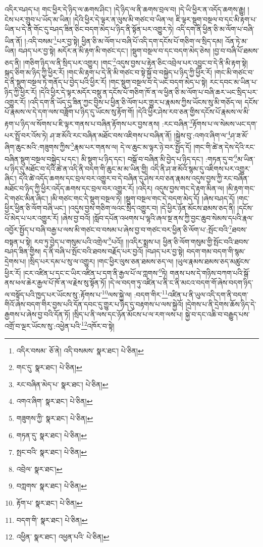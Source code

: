 འདིར་བཤད་པ། གང་ཕྱིར་དེ་ཉིད་ལ་ཆགས་ཤིང་། །དེ་ཉིད་ལ་ནི་ཆགས་བྲལ་བ། །དེ་ཡི་ཕྱིར་ན་འདོད་ཆགས་རྒྱུ། །ངེས་པར་གྲུབ་པ་ཡོད་མ་ཡིན། །དེའི་ཕྱིར་དེ་ལྟར་ན་ལུས་མི་གཙང་བ་ཡིན་ལ། ཇི་ལྟར་སྡུག་བསྔལ་བ་དང་མི་རྟག་པ་ཡིན་པ་དེ་ནི་གོང་དུ་བཤད་ཟིན་ཅིང་བདག་མེད་པ་ཉིད་ནི་སྟོན་པར་འགྱུར་ཏེ། འདི་དག་ནི་ཕྱིན་ཅི་མ་ལོག་པ་བཞི་ཡིན་ནོ། །:འདི་བསམ་\footnote{འདིར་བསམ་  ཅོ་ནེ། འདི་བསམས་  སྣར་ཐང་།  པེ་ཅིན། }པར་བྱ་སྟེ། ཕྱིན་ཅི་མ་ལོག་པ་བཞི་པོ་འདི་དག་དངོས་པོ་གཅིག་ལ་སྲིད་དམ། འོན་ཏེ་མ་ཡིན། བཤད་པར་བྱ་སྟེ། མདོར་ན་མི་རྟག་མི་གཙང་དང་། །སྡུག་བསྔལ་བ་དང་བདག་མེད་ཅེས། །བྱ་བ་བཞི་པོ་ཐམས་ཅད་ནི། །གཅིག་ཉིད་ལ་ནི་སྲིད་པར་འགྱུར། །གང་\footnote{གང་དུ་  སྣར་ཐང་།  པེ་ཅིན། }འདུས་བྱས་པ་རྟེན་ཅིང་འབྲེལ་པར་འབྱུང་བ་དེ་ནི་མི་རྟག་སྟེ། སྐད་ཅིག་མ་ཉིད་ཀྱི་ཕྱིར་རོ། །གང་མི་རྟག་པ་དེ་ནི་མི་གཙང་བ་སྟེ་སྐྱོ་བ་བསྐྱེད་པ་ཉིད་ཀྱི་ཕྱིར་རོ། །གང་མི་གཙང་བ་དེ་ནི་སྡུག་བསྔལ་ཏེ་གནོད་པ་བྱེད་པའི་ཕྱིར་རོ། །གང་སྡུག་བསྔལ་བ་དེ་ཡང་བདག་མེད་པ་སྟེ། རང་དབང་མ་ཡིན་པ་ཉིད་ཀྱི་ཕྱིར་རོ། །དེའི་ཕྱིར་དེ་ལྟར་མདོར་བསྡུ་ན་དངོས་པོ་གཅིག་ཁོ་ན་ལ་ཕྱིན་ཅི་མ་ལོག་པ་བཞི་ཆར་ཡང་སྲིད་པར་འགྱུར་རོ། །འདི་དག་ནི་ཡོད་དུ་ཟིན་ཀྱང་བྱིས་པ་ཕྱིན་ཅི་ལོག་པར་གྱུར་པ་རྣམས་ཀྱིས་ཡོངས་སུ་མི་གཅོད་ལ། དངོས་པོ་རྣམས་ལ་དེ་དག་ལས་བཟློག་པ་ཉིད་དུ་ཡོངས་སུ་རྟོག་གོ། །དེའི་ཕྱིར་ཤེས་རབ་ཅན་གྱིས་དངོས་པོ་རྣམས་ལ་མི་རྟག་པ་ཉིད་ལ་སོགས་པ་ཇི་ལྟར་གནས་པ་བཞིན་རྟོགས་པར་བྱས་ནས། :རང་བཞིན་\footnote{རང་བཞིན་མེད་པ་  སྣར་ཐང་།  པེ་ཅིན། }རྟོགས་པ་ལ་སེམས་ཡང་དག་པར་སྤྲོ་བར་འོས་ཏེ། ཤ་ཟ་མོའི་རང་བཞིན་མཐོང་བས་འཇིགས་པ་བཞིན་ནོ། །སྐྱེས་བུ་:འགའ་ཞིག་ལ་\footnote{འགའ་ཞིག་  སྣར་ཐང་།  པེ་ཅིན། }ཤ་ཟ་མོ་ཞིག་ཆུང་མའི་:གཟུགས་ཀྱིས་\footnote{གཟུགས་ཀྱི་  སྣར་ཐང་།  པེ་ཅིན། }རྣམ་པར་གནས་ལ། དེ་ལ་ཆུང་མ་ལྟར་ཉེ་བར་སྤྱོད་དོ། །གང་གི་ཚེ་ན་དེས་དེའི་རང་བཞིན་སྡུག་བསྔལ་བསྐྱེད་པ་དང་། མི་སྡུག་པ་ཉིད་དང་། བསྒོ་བ་བཞིན་མི་བྱེད་པ་ཉིད་དང་། :གཏན་དུ་བ་\footnote{གཏན་དུ་  སྣར་ཐང་།  པེ་ཅིན། }མ་ཡིན་པ་ཉིད་དུ་མཐོང་བ་དེའི་ཚེ་ན་འདི་ནི་བདག་གི་ཆུང་མ་མ་ཡིན་གྱི། འདི་ནི་ཤ་ཟ་མོའོ་སྙམ་དུ་འཇིགས་པར་འགྱུར་ཞིང་། དེའི་ཚེ་འདོད་ཆགས་དང་བྲལ་བར་འགྱུར་བ་དེ་བཞིན་དུ་ཤེས་རབ་ཅན་རྣམས་འདུས་བྱས་ཀྱི་རང་བཞིན་མཐོང་བ་ཉིད་ཀྱི་ཕྱིར་འདོད་ཆགས་དང་བྲལ་བར་འགྱུར་རོ། །འདིར། འདུས་བྱས་གང་དེ་རྟག་མིན་ལ། །མི་རྟག་གང་དེ་གཙང་མིན་ཞིང་། །མི་གཙང་གང་དེ་སྡུག་བསྔལ་ཏེ། །སྡུག་བསྔལ་གང་དེ་བདག་མེད་དོ། །ཞེས་བཤད་དོ། །གང་ཕྱིར་ཕྱིན་ཅི་ལོག་བཞི་ཡང་། །འདུས་བྱས་གཅིག་ལའང་སྲིད་འགྱུར་བ། །དེ་ཕྱིར་ཉོན་མོངས་ཐམས་ཅད་ནི། །དངོས་པོ་མེད་པ་པར་འགྱུར་རོ། །ཞེས་བྱ་བའོ། །སློབ་དཔོན་འཕགས་པ་ལྷའི་ཞལ་སྔ་ནས་ཀྱི་བྱང་ཆུབ་སེམས་དཔའི་རྣལ་འབྱོར་སྤྱོད་པ་བཞི་བརྒྱ་པ་ལས་མི་གཙང་བ་བསམ་པ་ཞེས་བྱ་བ་གཙང་བར་ཕྱིན་ཅི་ལོག་པ་:སྤོང་བའི་\footnote{སྤང་བའི་  སྣར་ཐང་།  པེ་ཅིན། }ཐབས་བསྟན་པ་སྟེ། རབ་ཏུ་བྱེད་པ་གསུམ་པའི་འགྲེལ་\footnote{འབྲེལ་  སྣར་ཐང་། }པའོ།། །།འདིར་སྨྲས་པ། ཕྱིན་ཅི་ལོག་གསུམ་གྱི་སྤོང་བའི་ཐབས་བཤད་ཟིན་གྱིས། ད་ནི་བཞི་པ་སྤོང་བའི་ཐབས་བརྗོད་པར་བྱའོ། །བཤད་པར་བྱ་སྟེ། བདག་གམ་བདག་གི་སྙམ་དྲེགས་པ། །སྲིད་པར་དམ་པ་སུ་ལ་འགྱུར། །གང་ཕྱིར་ལུས་ཅན་ཐམས་ཅད་ལ། །ཡུལ་རྣམས་ཐམས་ཅད་མཚུངས་ཕྱིར་རོ། །ངར་འཛིན་པ་དང་ང་ཡིར་འཛིན་པ་དག་ནི་རྒྱལ་པོ་ལ་ཀླགས་\footnote{བཀླགས་  སྣར་ཐང་།  པེ་ཅིན། }ཏེ། གནས་པས་དེ་གཉིས་བཀག་པའི་སྒོ་ནས་ཕལ་ཆེར་རྒྱལ་པོ་ཁོ་ན་ལ་རྗེས་སུ་སྟོན་ཏོ། །དེ་ལ་བདག་ཏུ་འཛིན་པ་ནི་ང་ནི་མངའ་བདག་གོ་ཞེས་བདག་ཉིད་ལ་བསྟོད་པའི་ཁྱད་པར་ཡོངས་སུ་:རྟོགས་པ་\footnote{རྟོག་པ་  སྣར་ཐང་།  པེ་ཅིན། }ལས་སྐྱེ་ལ། :བདག་གིར་\footnote{བདག་གི་  སྣར་ཐང་།  པེ་ཅིན། }འཛིན་པ་ནི་ཡུལ་འདི་དག་ནི་བདག་གིའོ་ཞེས་བདག་གིར་བྱས་པའི་དོན་དབང་དུ་གྱུར་པ་ཉིད་དུ་བརྟགས་པ་ལས་སྐྱེའོ། །དྲེགས་པ་ནི་དྲེགས་ཆོས་ཉིད་དེ་རྒྱགས་པ་ཞེས་བྱ་བའི་དོན་ཏོ། །སྲིད་པ་ནི་ལས་དང་ཉོན་མོངས་པ་ལ་རག་ལས་པ། སྐྱེ་བ་དང་འཆི་བ་བརྒྱུད་པས་འགྲོ་བ་ལྔར་ཡོངས་སུ་:འཕྱེན་པའི་\footnote{འཕྱིན་  སྣར་ཐང་། འཕྱན་པའི་  པེ་ཅིན། }འཁོར་བ་སྟེ། 